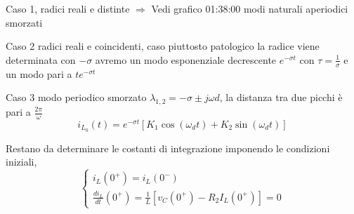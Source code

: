 Caso 1, radici reali e distinte $\Rightarrow$
Vedi grafico 01:38:00 modi naturali aperiodici smorzati

Caso 2 radici reali e coincidenti, caso piuttosto patologico
la radice viene determinata con $-\sigma$ avremo un modo esponenziale decrescente $e^{-\sigma t} $ con $\tau = \frac{1}{\sigma}$
e un modo pari a  $te^{-\sigma t}$

Caso 3 modo periodico smorzato
$\lambda_{1,2} = -\sigma \pm j\omega d$, la distanza tra due picchi è pari a $\frac{2\pi}{\omega}$
$$i_{L_0}(t) = e^{-\sigma t} [K_1 \cos (\omega_d t) + K_2 \sin(\omega_d t)]$$

Restano da determinare le costanti di integrazione imponendo le condizioni iniziali,
\begin{equation*}
\begin{cases}
i_L(0^+) = i_L(0^-) \\
\frac{di_L}{dt}(0^+) = \frac{1}{L}[v_C(0^+) - R_2I_L(0^+)] = 0
\end{cases}
\end{equation*}
